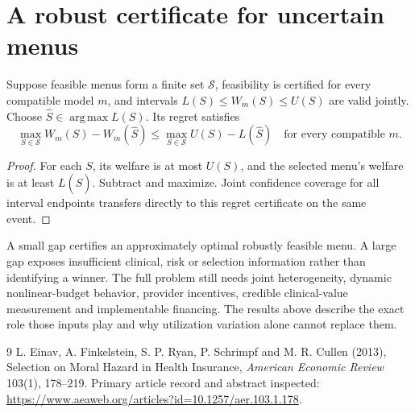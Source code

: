 \documentclass[11pt]{article}
\DeclareMathOperator*{\argmax}{arg\,max}
\begin{document}
\section*{A robust certificate for uncertain menus}
Suppose feasible menus form a finite set $\mathcal S$, feasibility is certified for every compatible model $m$, and intervals $L(S)\leq W_m(S)\leq U(S)$ are valid jointly. Choose $\widehat S\in\argmax L(S)$. Its regret satisfies
\[
 \max_{S\in\mathcal S}W_m(S)-W_m(\widehat S)
 \leq \max_{S\in\mathcal S}U(S)-L(\widehat S)
 \quad\text{for every compatible }m.
\]
\begin{proof}
For each $S$, its welfare is at most $U(S)$, and the selected menu's welfare is at least $L(\widehat S)$. Subtract and maximize. Joint confidence coverage for all interval endpoints transfers directly to this regret certificate on the same event.
\end{proof}

A small gap certifies an approximately optimal robustly feasible menu. A large gap exposes insufficient clinical, risk or selection information rather than identifying a winner. The full problem still needs joint heterogeneity, dynamic nonlinear-budget behavior, provider incentives, credible clinical-value measurement and implementable financing. The results above describe the exact role those inputs play and why utilization variation alone cannot replace them.

\begin{thebibliography}{9}
 L. Einav, A. Finkelstein, S. P. Ryan, P. Schrimpf and M. R. Cullen (2013), Selection on Moral Hazard in Health Insurance, \emph{American Economic Review} 103(1), 178--219. Primary article record and abstract inspected: \url{https://www.aeaweb.org/articles?id=10.1257/aer.103.1.178}.
\end{thebibliography}
\end{document}
